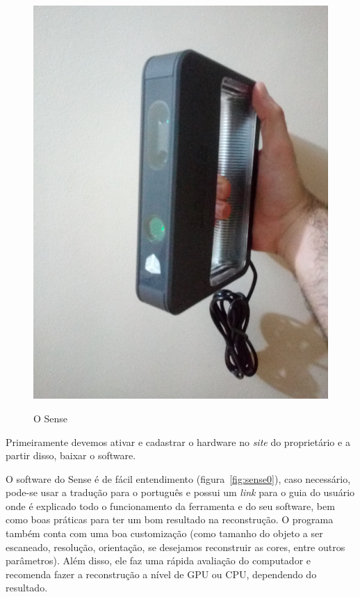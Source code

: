 \begin{figure}[!h]
	\centering
	\caption{O Sense}
	\includegraphics[width=1\linewidth]{figs/senseFoto2.jpg}
		\label{fig:fotoSense1}
\end{figure}

\newpage

Primeiramente devemos ativar e cadastrar o hardware no \emph{site} do proprietário e a partir disso, baixar o software.

O software do Sense é de fácil entendimento (figura~\ref{fig:sense0}), caso necessário, pode-se usar a tradução para o português e possui um \emph{link} para o guia do usuário onde é explicado todo o funcionamento da ferramenta e do seu software, bem como boas práticas para ter um bom resultado na reconstrução. O programa também conta com uma boa customização (como tamanho do objeto a ser escaneado, resolução, orientação, se desejamos reconstruir as cores, entre outros parâmetros). Além disso, ele faz uma rápida avaliação do computador e recomenda fazer a reconstrução a nível de GPU ou CPU, dependendo do resultado.

